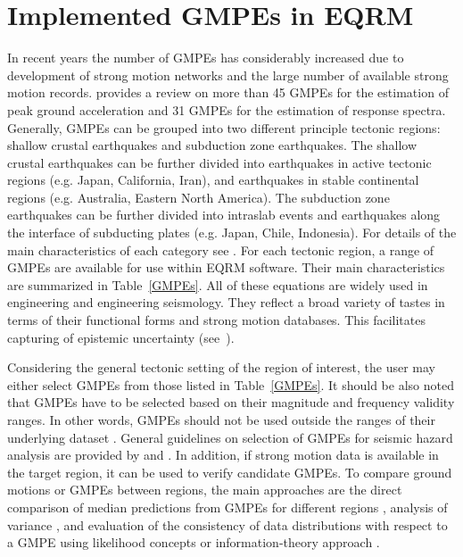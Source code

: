 \section{Implemented GMPEs in EQRM}\label{sec:implemented} In
recent years the number of GMPEs has considerably increased due to
development of strong motion networks and the large number of
available strong motion records. \citet{eqrm_Douglas06} provides a
review on more than 45 GMPEs for the estimation of peak ground
acceleration and 31 GMPEs for the estimation of response spectra.
Generally, GMPEs can be grouped into two different principle
tectonic regions: shallow crustal earthquakes and subduction zone
earthquakes. The shallow crustal earthquakes can be further divided
into earthquakes in active tectonic regions (e.g. Japan, California,
Iran), and earthquakes in stable continental regions (e.g.
Australia, Eastern North America). The subduction zone earthquakes
can be further divided into intraslab events and earthquakes along
the interface of subducting plates (e.g. Japan, Chile, Indonesia).
For details of the main characteristics of each category see
\citet{eqrm_Campbell03}. For each tectonic region, a range of GMPEs
are available for use within EQRM software. Their main
characteristics are summarized in Table~\ref{GMPEs}. All of these
equations are widely used in engineering and engineering seismology.
They reflect a broad variety of tastes in terms of their functional
forms and strong motion databases. This facilitates capturing of
epistemic uncertainty (see~).

Considering the general tectonic setting of the region of interest,
the user may either select GMPEs from those listed in
Table~\ref{GMPEs}. It should be also noted that GMPEs have to be
selected based on their magnitude and frequency validity ranges. In
other words, GMPEs should not be used outside the ranges of their
underlying dataset \citep{eqrm_Bommer07}. General guidelines on
selection of GMPEs for seismic hazard analysis are provided by
\citet{eqrm_Cotton06} and \citet{eqrm_Bommer10}. In addition, if
strong motion data is available in the target region, it can be used
to verify candidate GMPEs. To compare ground motions or GMPEs
between regions, the main approaches are the direct comparison of
median predictions from GMPEs for different regions
\citep{eqrm_Stafford08}, analysis of variance
\citep{eqrm_Douglas04}, and evaluation of the consistency of data
distributions with respect to a GMPE using likelihood concepts
\citep{eqrm_Scherbaum04} or information-theory approach
\citep{eqrm_Scherbaum09}.

